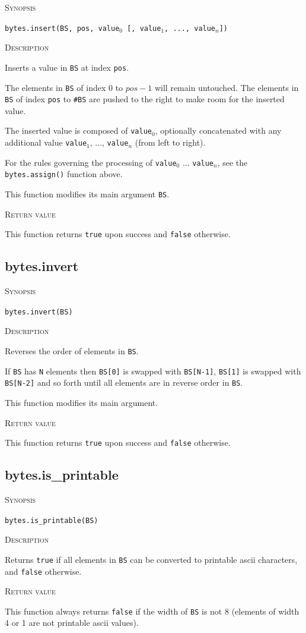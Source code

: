 \documentclass[11pt]{report}
\newcommand{\mansection}[1]{\vspace{0.5em}\par\noindent\textsc{#1}\vspace{0.5em}\par}
\newcommand{\syn}[1]{\texttt{#1}}
\begin{document}
\mansection{Synopsis}
\syn{bytes.insert(BS, pos, \syn{value$_0$} [, \syn{value$_1$}, ..., \syn{value$_n$}])}

\mansection{Description}
  Inserts a value in \syn{BS} at index \syn{pos}.

  The elements in \syn{BS} of index 0 to $pos-1$ will remain untouched.
  The elements in \syn{BS} of index \syn{pos} to \syn{\#BS} are pushed to the right
  to make room for the inserted value.

  The inserted value is composed of \syn{value$_0$}, optionally concatenated with
  any additional value \syn{value$_1$}, ..., \syn{value$_n$} (from left to right).

  For the rules governing the processing of \syn{value$_0$} ... \syn{value$_n$}, see
  the \syn{bytes.assign()} function above.

  This function modifies its main argument \syn{BS}.
  
\mansection{Return value}
  This function returns \syn{true} upon success and \syn{false} otherwise.

\subsection{bytes.invert}

\mansection{Synopsis}
\syn{bytes.invert(BS)}

\mansection{Description}
  Reverses the order of elements in \syn{BS}.

  If \syn{BS} has \syn{N} elements then \syn{BS[0]} is swapped with \syn{BS[N-1]},
  \syn{BS[1]} is swapped with \syn{BS[N-2]} and so forth until all elements are
  in reverse order in \syn{BS}.

  This function modifies its main argument.
\mansection{Return value}
  This function returns \syn{true} upon success and \syn{false} otherwise.


\subsection{bytes.is\_printable}

\mansection{Synopsis}
\syn{bytes.is\_printable(BS)}

\mansection{Description}
  Returns \syn{true} if all elements in \syn{BS} can be converted to 
  printable ascii characters, and \syn{false} otherwise.

\mansection{Return value}
  This function always returns \syn{false} if the width of \syn{BS} is 
  not 8 (elements of width 4 or 1 are not printable ascii values).  
\end{document}

